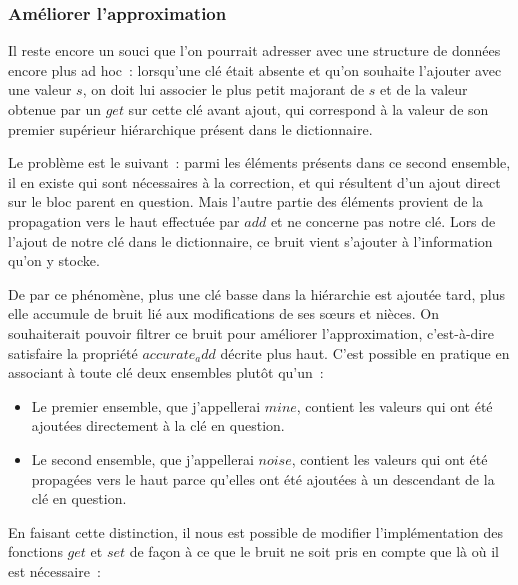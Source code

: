 \documentclass{article}
\begin{document}
\subsubsection{Améliorer l'approximation}

Il reste encore un souci que l'on pourrait adresser avec une structure de
données encore plus ad hoc~: lorsqu'une clé était absente et qu'on souhaite
l'ajouter avec une valeur $s$, on doit lui associer le plus petit
majorant de $s$ et de la valeur obtenue par un $get$
sur cette clé avant ajout, qui correspond à la valeur de son premier supérieur
hiérarchique présent dans le dictionnaire.

Le problème est le suivant~: parmi les éléments présents dans ce second
ensemble, il en existe qui sont nécessaires à la correction, et qui résultent
d'un ajout direct sur le bloc parent en question. Mais l'autre partie des
éléments provient de la propagation vers le haut effectuée par
$add$ et ne concerne pas notre clé. Lors de l'ajout de notre clé
dans le dictionnaire, ce bruit vient s'ajouter à l'information qu'on y stocke.

De par ce phénomène, plus une clé basse dans la hiérarchie est ajoutée tard,
plus elle accumule de bruit lié aux modifications de ses sœurs et nièces. On
souhaiterait pouvoir filtrer ce bruit pour améliorer l'approximation,
c'est-à-dire satisfaire la propriété $accurate_add$ décrite plus
haut. C'est possible en pratique en associant à toute clé deux ensembles plutôt
qu'un~:

\begin{itemize}

\item Le premier ensemble, que j'appellerai $mine$, contient les
valeurs qui ont été ajoutées directement à la clé en question.

\item Le second ensemble, que j'appellerai $noise$, contient les
valeurs qui ont été propagées vers le haut parce qu'elles ont été ajoutées à un
descendant de la clé en question.

\end{itemize}

En faisant cette distinction, il nous est possible de modifier l'implémentation
des fonctions $get$ et $set$ de façon à ce que le bruit
ne soit pris en compte que là où il est nécessaire~:
\end{document}
